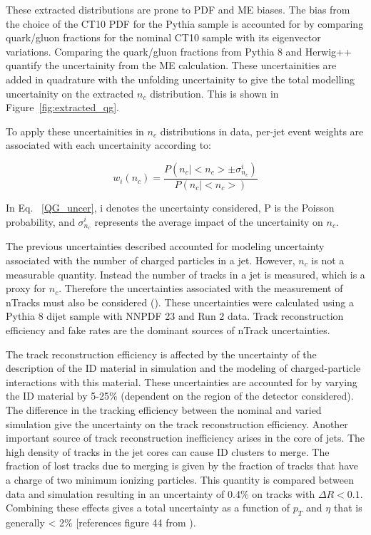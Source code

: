 These extracted distributions are prone to PDF and ME biases. The bias from the choice of the CT10 PDF for the Pythia sample is accounted for by comparing quark/gluon fractions for the nominal CT10 sample with its eigenvector variations. Comparing the quark/gluon fractions from Pythia 8 and Herwig++ quantify the uncertainity from the ME calculation. These uncertainities are added in quadrature with the unfolding uncertainity to give the total modelling uncertainity on the extracted $n_{c}$ distribution. This is shown in Figure~\ref{fig:extracted_qg}.

To apply these uncertainities in $n_{c}$ distributions in data, per-jet event weights are associated with each uncertainity according to:

\begin{equation}
w_{i}(n_{c}) = \frac{P(n_{c}|<n_{c}> \pm \sigma^{i}_{n_{c}})} {P(n_{c}|<n_{c}>)}
\end{equation}

In Eq. ~\eqref{QG_uncer}, i denotes the uncertainty considered, P is the Poisson probability, and $\sigma^{i}_{n_{c}}$ represents the average impact of the uncertainity on $n_{c}$. 



The previous uncertainties described accounted for modeling uncertainty associated with the number of charged particles in a jet. However, $n_{c}$ is not a measurable quantity. Instead the number of tracks in a jet is measured, which is a proxy for $n_{c}$. Therefore the uncertainties associated with the measurement of nTracks must also be considered (\cite{JetFrag}). These uncertainties were calculated using a Pythia 8 dijet sample with NNPDF 23 and Run 2 data. Track reconstruction efficiency and fake rates are the dominant sources of nTrack uncertainties. 

The track reconstruction efficiency is affected by the uncertainty of the description of the ID material in simulation and the modeling of charged-particle interactions with this material. These uncertainties are accounted for by varying the ID material by 5-25\% (dependent on the region of the detector considered). The difference in the tracking efficiency between the nominal and varied simulation give the uncertainty on the track reconstruction efficiency. Another important source of track reconstruction inefficiency arises in the core of jets. The high density of tracks in the jet cores can cause ID clusters to merge. The fraction of lost tracks due to merging is given by the fraction of tracks that have a charge of two minimum ionizing particles. This quantity is compared between data and simulation resulting in an uncertainty of 0.4\% on tracks with $\Delta R < 0.1$. Combining these effects gives a total uncertainty as a function of $p_{T}$ and $\eta$ that is generally < 2\% [references figure 44 from \cite{JetFrag}). 

